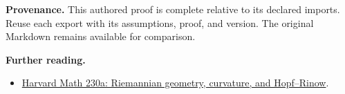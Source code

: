 \documentclass[preprint,12pt,aps,pra,showkeys,amsmath,amssymb,superscriptaddress,floatfix]{revtex4-2}
\theoremstyle{definition}
\theoremstyle{remark}
\providecommand{\tightlist}{\setlength{\itemsep}{2pt}\setlength{\parskip}{0pt}}
\begin{document}
\par\medskip\begingroup\small\linespread{1.0}\selectfont\noindent\textbf{Provenance.} This authored proof is complete relative to its declared imports. Reuse
each export with its assumptions, proof, and version. The original
Markdown remains available for comparison.
\par\endgroup

\par\smallskip\begingroup\small\linespread{1.0}\selectfont\noindent\textbf{Further reading.} \begin{itemize}
\tightlist
\item
  \href{https://people.math.harvard.edu/~landesman/assets/math-230a-harvard-differential-geometry-notes.pdf}{Harvard
  Math 230a: Riemannian geometry, curvature, and Hopf--Rinow}.
\end{itemize}\par\endgroup
\end{document}
